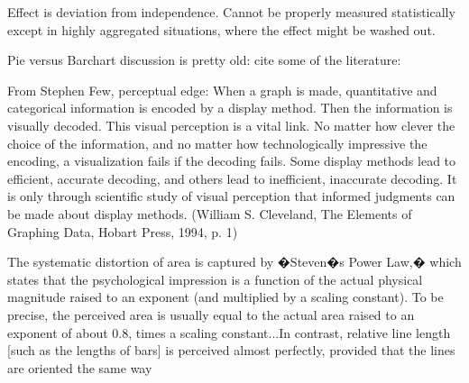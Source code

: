 Effect is deviation from independence. Cannot be properly measured statistically except in highly aggregated situations, where the effect might be washed out.



Pie versus Barchart discussion is pretty old: cite some of the literature:

From Stephen Few, perceptual edge:
	When a graph is made, quantitative and categorical information is encoded by a display method. Then the information is visually decoded. This visual perception is a vital link. No matter how clever the choice of the information, and no matter how technologically impressive the encoding, a visualization fails if the decoding fails. Some display methods lead to efficient, accurate decoding, and others lead to inefficient, inaccurate decoding. It is only through scientific study of visual perception that informed judgments can be made about display methods. (William S. Cleveland, The Elements of Graphing Data, Hobart Press, 1994, p. 1)
	
	The systematic distortion of area is captured by �Steven�s Power Law,� which states that the psychological impression is a function of the actual physical magnitude raised to an exponent (and multiplied by a scaling constant). To be precise, the perceived area is usually equal to the actual area raised to an exponent of about 0.8, times a scaling constant...In contrast, relative line length [such as the lengths of bars] is perceived almost perfectly, provided that the lines are oriented the same way \cite[page=40]{kosslyn:2006}
	
